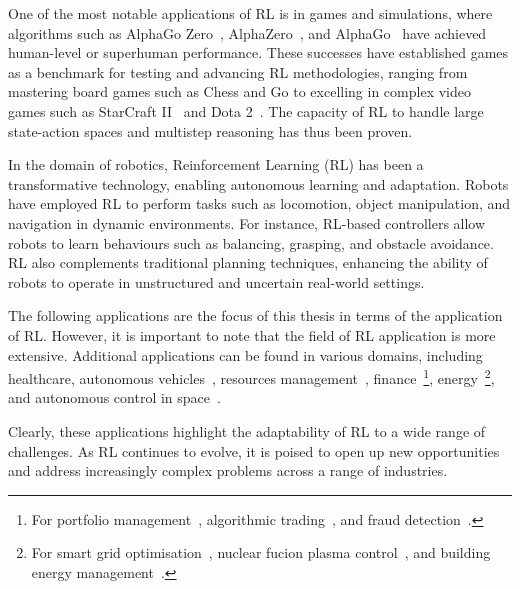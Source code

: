 One of the most notable applications of RL is in games and simulations, where algorithms such as AlphaGo
Zero~\citep{silver2017masteringgo}, AlphaZero~\citep{silver2017masteringchessandgo}, and
AlphaGo~\citep{silver2016mastering} have achieved human-level or superhuman performance.
These successes have established games as a benchmark for testing and advancing RL methodologies, ranging from
mastering board games such as Chess and Go to excelling in complex video games such as
StarCraft II~\citep{vinyals2019grandmaster} and Dota 2~\citep{berner2019dota}.
The capacity of RL to handle large state-action spaces and multistep reasoning has thus been proven.


In the domain of robotics, Reinforcement Learning (RL) has been a transformative technology, enabling autonomous
learning and adaptation.
Robots have employed RL to perform tasks such as locomotion, object manipulation, and navigation in dynamic
environments.
For instance, RL-based controllers allow robots to learn behaviours such as balancing, grasping, and obstacle avoidance.
RL also complements traditional planning techniques, enhancing the ability of robots to operate in unstructured and
uncertain real-world settings.

The following applications are the focus of this thesis in terms of the application of RL.
However, it is important to note that the field of RL application is more extensive.
Additional applications can be found in various domains, including healthcare, autonomous
vehicles~\citep{kiran2021deep}, resources management~\citep{mao2016resource}, finance~\footnote{For portfolio
management~\citep{jiang2017deep}, algorithmic trading~\citep{theate2021application}, and fraud
detection~\citep{el2017fraud}.},
energy~\footnote{For smart grid optimisation~\citep{zhang2018review}, nuclear fucion plasma
control~\citep{degrave2022magnetic}, and building energy management~\citep{yu2021review}.}, and autonomous control in space~\citep{tipaldi2022reinforcement}.

Clearly, these applications highlight the adaptability of RL to a wide range of challenges.
As RL continues to evolve, it is poised to open up new opportunities and address increasingly complex problems across a
range of industries.
